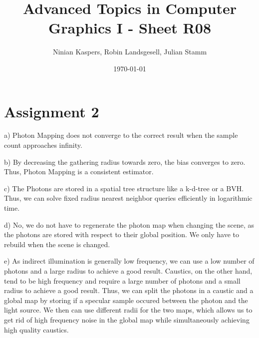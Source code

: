 \documentclass{article}
\title{Advanced Topics in Computer Graphics I - Sheet R08}
\author{Ninian Kaspers, Robin Landsgesell, Julian Stamm}
\date{\today}
\begin{document}
    \maketitle

    \section*{Assignment 2}

    a) Photon Mapping does not converge to the correct result when the sample count approaches infinity.

    b) By decreasing the gathering radius towards zero, the bias converges to zero.
    Thus, Photon Mapping is a consistent estimator.

    c) The Photons are stored in a spatial tree structure like a k-d-tree or a BVH.
    Thus, we can solve fixed radius nearest neighbor queries efficiently in logarithmic time.

    d) No, we do not have to regenerate the photon map when changing the scene, as the photons are stored with respect to their global position.
    We only have to rebuild when the scene is changed.

    e) As indirect illumination is generally low frequency, we can use a low number of photons and a large radius to achieve a good result.
    Caustics, on the other hand, tend to be high frequency and require a large number of photons and a small radius to achieve a good result.
    Thus, we can split the photons in a caustic and a global map by storing if a specular sample occured between the photon and the light source.
    We then can use different radii for the two maps, which allows us to get rid of high frequency noise in the global map while simultaneously achieving high quality caustics.
\end{document}
